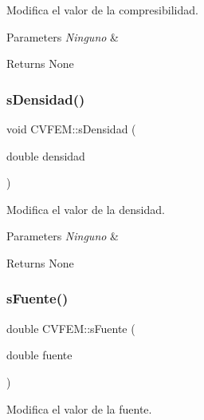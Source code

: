 Modifica el valor de la compresibilidad. 


\begin{DoxyParams}{Parameters}
{\em Ninguno} & \\
\hline
\end{DoxyParams}
\begin{DoxyReturn}{Returns}
None 
\end{DoxyReturn}
\hypertarget{class_c_v_f_e_m_ae28f0a371ddc5ae1728bf26c31762364}{}\label{class_c_v_f_e_m_ae28f0a371ddc5ae1728bf26c31762364} 
\subsubsection{\texorpdfstring{s\+Densidad()}{sDensidad()}}
{\footnotesize\ttfamily void C\+V\+F\+E\+M\+::s\+Densidad (\begin{DoxyParamCaption}\item[{double}]{densidad }\end{DoxyParamCaption})\hspace{0.3cm}{\ttfamily [inline]}}



Modifica el valor de la densidad. 


\begin{DoxyParams}{Parameters}
{\em Ninguno} & \\
\hline
\end{DoxyParams}
\begin{DoxyReturn}{Returns}
None 
\end{DoxyReturn}
\hypertarget{class_c_v_f_e_m_a2c3c174843a173f1419c41963e1d8f1f}{}\label{class_c_v_f_e_m_a2c3c174843a173f1419c41963e1d8f1f} 
\subsubsection{\texorpdfstring{s\+Fuente()}{sFuente()}}
{\footnotesize\ttfamily double C\+V\+F\+E\+M\+::s\+Fuente (\begin{DoxyParamCaption}\item[{double}]{fuente }\end{DoxyParamCaption})\hspace{0.3cm}{\ttfamily [inline]}}



Modifica el valor de la fuente. 


